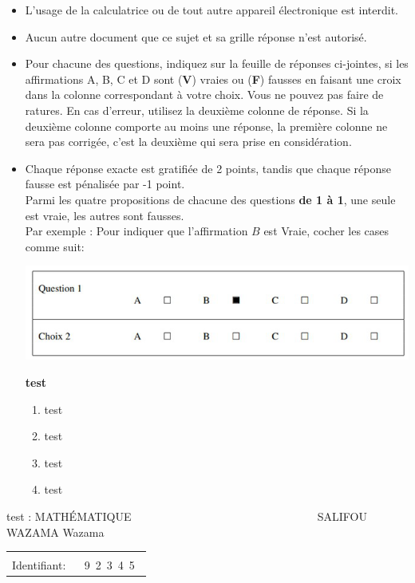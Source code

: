 \documentclass{book}%
\begin{document}
\begin{itemize}%
\item%
L'usage de la calculatrice ou de tout autre appareil électronique est interdit.%
\item%
Aucun autre document que ce sujet et sa grille réponse n'est autorisé.%
\item%
Pour chacune des questions, indiquez sur la feuille de réponses ci-jointes, si les affirmations A, B, C et D sont (\textbf{V}) vraies ou (\textbf{F}) fausses en faisant une croix dans la colonne correspondant à votre choix. Vous ne pouvez pas faire de ratures. En cas d'erreur, utilisez la deuxième colonne de réponse. Si la deuxième colonne comporte au moins une réponse, la première colonne ne sera pas corrigée, c'est la deuxième qui sera prise en considération.%
\item%
Chaque réponse exacte est gratifiée de 2 points, tandis que chaque réponse fausse est pénalisée par -1 point. \\ 	Parmi les quatre propositions de chacune des questions \textbf{de 1 à 1}, une seule est vraie, les autres sont fausses. \\ 	Par exemple : Pour indiquer que l'affirmation $B$ est Vraie, cocher les cases comme suit:  \\ \begin{center}	\includegraphics[scale=0.8]{reponses.png} \end{center}%
\thispagestyle{empty}%
\begin{exercise}%
\textbf{test }%
\begin{enumerate}[label=\textbf{\Alph*. }]%
\item%
test%
\item%
test%
\item%
test%
\item%
test%
\end{enumerate}%
\end{exercise}%
\end{itemize}%
\newpage%
\thispagestyle{empty}%
test : MATHÉMATIQUE $\qquad \qquad \qquad \qquad \qquad \qquad \qquad \qquad$ SALIFOU WAZAMA Wazama %
\begin{flushright}%
\begin{tabular}{|l|}%
\hline%
 \\%
\thispagestyle{empty}%
Identifiant: $\quad$ {\Large 9~2~3~4~5~}%
 \\%
\hline%
\end{tabular}%
\end{flushright}%
\end{document}
